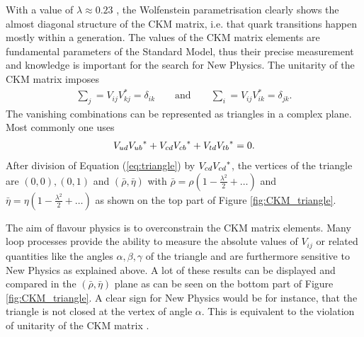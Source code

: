 With a value of $\lambda \approx 0.23$ \cite{PDG}, the Wolfenstein parametrisation clearly shows the almost diagonal structure of the CKM matrix, i.e. that quark transitions happen mostly within a generation.
The values of the CKM matrix elements are fundamental parameters of the Standard Model, thus their precise measurement and knowledge is important for the search for New Physics.
The unitarity of the CKM matrix imposes
\begin{align}
    \sum_j = V_{ij}V_{kj}^{\ast} = \delta_{ik} \qquad \text{and} \qquad \sum_i = V_{ij}V_{ik}^{\ast} = \delta_{jk}.
\end{align}
The vanishing combinations can be represented as triangles in a complex plane.
Most commonly one uses
\begin{align}
    {\ensuremath{V_{{u}{d}}}}{\ensuremath{V_{{u}{b}}}}^{\ast} + {V_{{c}{d}}}{V_{{c}{b}}}^{*} + {V_{{t}{d}}}{V_{{t}{b}}}^{\ast} = 0. \label{eq:triangle}
\end{align}
After division of Equation (\ref{eq:triangle}) by ${V_{{c}{d}}}{V_{{c}{d}}}^{\ast}$, the vertices of the triangle are $(0,0), (0,1)$ and $(\bar{\rho}, \bar{\eta})$ with $\bar{\rho} = \rho (1 - \frac{\lambda^2}{2} + \ldots)$ and $\bar{\eta} = \eta (1 - \frac{\lambda^2}{2} + \ldots)$ as shown on the top part of Figure \ref{fig:CKM_triangle}.

The aim of flavour physics is to overconstrain the CKM matrix elements.
Many loop processes provide the ability to measure the absolute values of $V_{ij}$ or related quantities like the angles $\alpha, \beta, \gamma$ of the triangle and are furthermore sensitive to New Physics as explained above.
A lot of these results can be displayed and compared in the $(\bar{\rho}, \bar{\eta})$ plane as can be seen on the bottom part of Figure \ref{fig:CKM_triangle}.
A clear sign for New Physics would be for instance, that the triangle is not closed at the vertex of angle $\alpha$.
This is equivalent to the violation of unitarity of the CKM matrix \cite{PDG, Nierste}.


